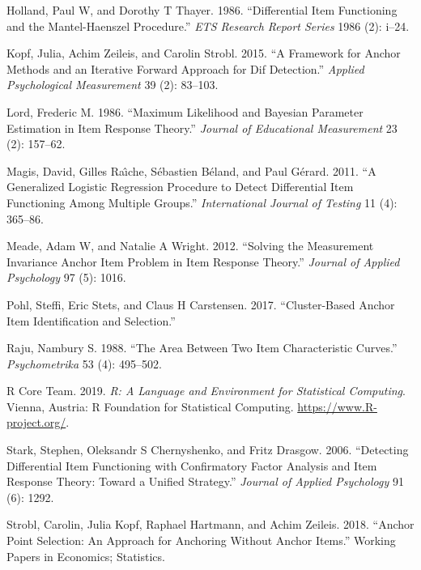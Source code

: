 \documentclass[
  11pt,
]{article}
\begin{document}
\leavevmode\hypertarget{ref-holland1986differential}{}%
Holland, Paul W, and Dorothy T Thayer. 1986. ``Differential Item Functioning and the Mantel-Haenszel Procedure.'' \emph{ETS Research Report Series} 1986 (2): i--24.

\leavevmode\hypertarget{ref-kopf2015framework}{}%
Kopf, Julia, Achim Zeileis, and Carolin Strobl. 2015. ``A Framework for Anchor Methods and an Iterative Forward Approach for Dif Detection.'' \emph{Applied Psychological Measurement} 39 (2): 83--103.

\leavevmode\hypertarget{ref-lord1986maximum}{}%
Lord, Frederic M. 1986. ``Maximum Likelihood and Bayesian Parameter Estimation in Item Response Theory.'' \emph{Journal of Educational Measurement} 23 (2): 157--62.

\leavevmode\hypertarget{ref-magis2011generalized}{}%
Magis, David, Gilles Raı̂che, Sébastien Béland, and Paul Gérard. 2011. ``A Generalized Logistic Regression Procedure to Detect Differential Item Functioning Among Multiple Groups.'' \emph{International Journal of Testing} 11 (4): 365--86.

\leavevmode\hypertarget{ref-meade2012solving}{}%
Meade, Adam W, and Natalie A Wright. 2012. ``Solving the Measurement Invariance Anchor Item Problem in Item Response Theory.'' \emph{Journal of Applied Psychology} 97 (5): 1016.

\leavevmode\hypertarget{ref-pohl2017cluster}{}%
Pohl, Steffi, Eric Stets, and Claus H Carstensen. 2017. ``Cluster-Based Anchor Item Identification and Selection.''

\leavevmode\hypertarget{ref-raju1988area}{}%
Raju, Nambury S. 1988. ``The Area Between Two Item Characteristic Curves.'' \emph{Psychometrika} 53 (4): 495--502.

\leavevmode\hypertarget{ref-rcore}{}%
R Core Team. 2019. \emph{R: A Language and Environment for Statistical Computing}. Vienna, Austria: R Foundation for Statistical Computing. \url{https://www.R-project.org/}.

\leavevmode\hypertarget{ref-stark2006detecting}{}%
Stark, Stephen, Oleksandr S Chernyshenko, and Fritz Drasgow. 2006. ``Detecting Differential Item Functioning with Confirmatory Factor Analysis and Item Response Theory: Toward a Unified Strategy.'' \emph{Journal of Applied Psychology} 91 (6): 1292.

\leavevmode\hypertarget{ref-strobl2018anchor}{}%
Strobl, Carolin, Julia Kopf, Raphael Hartmann, and Achim Zeileis. 2018. ``Anchor Point Selection: An Approach for Anchoring Without Anchor Items.'' Working Papers in Economics; Statistics.
\end{document}
